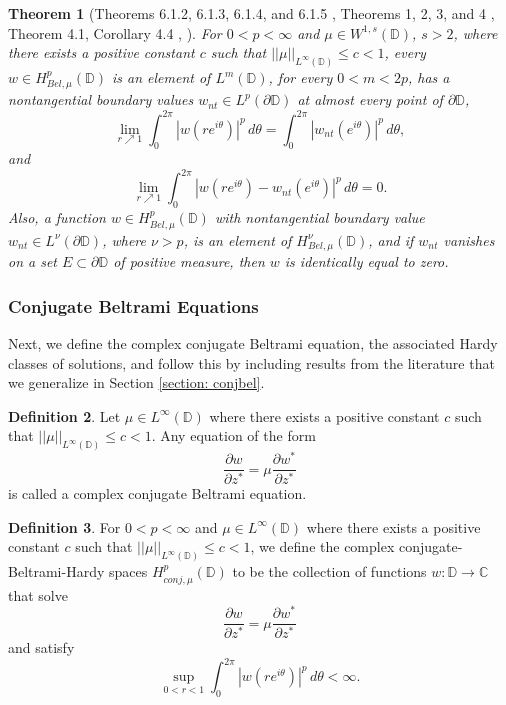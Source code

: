 \documentclass[12pt,reqno]{amsart}
\newtheorem{theorem}{Theorem}[section]
\theoremstyle{definition}
\newtheorem{deff}[theorem]{Definition}
\theoremstyle{remark}
\newcommand{\p}{\partial}
\newcommand{\disk}{\mathbb{D}}
\begin{document}
 \begin{theorem}[Theorems 6.1.2, 6.1.3, 6.1.4, and 6.1.5 \cite{KlimBook}, Theorems 1, 2, 3, and 4 \cite{Klim2016}, Theorem 4.1, Corollary 4.4  \cite{quasiHardy}, \cite{Zins}]\label{thm: belhpinbetterlp}\label{thm: belbvcon}\label{thm: betterbvbetterleb}\label{thm: zeroposmesidentzero}
             For $0 < p < \infty$ and $\mu \in W^{1,s}(\disk)$, $s>2$, where there exists a positive constant $c$ such that $||\mu||_{L^\infty(\disk)} \leq c < 1$, every $w \in H^{p}_{Bel,\mu}(\disk)$ is an element of $L^m(\disk)$, for every $0 < m < 2p$, has a nontangential boundary values $w_{nt} \in L^p(\partial \disk)$ at almost every point of $\p \disk$,
        \[
            \lim_{r\nearrow 1} \int_0^{2\pi} |w(re^{i\theta})|^p \, d\theta = \int_0^{2\pi} |w_{nt}(e^{i\theta})|^p \,d\theta,
        \]
and
        \[
            \lim_{r\nearrow 1} \int_0^{2\pi} |w(re^{i\theta})- w_{nt}(e^{i\theta})|^p \, d\theta = 0.
        \]
Also, a function $w \in H^p_{Bel,\mu}(\disk)$ with nontangential boundary value $w_{nt} \in L^\nu(\p \disk)$, where $\nu > p$, is an element of $H^\nu_{Bel,\mu}(\disk)$, and if $w_{nt}$ vanishes on a set $E \subset \p \disk$ of positive measure, then $w$ is identically equal to zero.
        \end{theorem}



        \subsubsection{Conjugate Beltrami Equations}

        

        Next, we define the complex conjugate Beltrami equation, the associated Hardy classes of solutions, and follow this by including results from the literature that we generalize in Section \ref{section: conjbel}.

        \begin{deff}
            Let $\mu \in L^\infty(\disk)$ where there exists a positive constant $c$ such that $||\mu||_{L^\infty(\disk)} \leq c < 1$. Any equation of the form 
            \[
                \frac{\p w}{\p z^*} = \mu \frac{\p w^*}{\p  z^*}
            \]
            is called a complex conjugate Beltrami equation. 
        \end{deff}

        \begin{deff}
            For $0 < p < \infty$ and $\mu \in L^\infty(\disk)$ where there exists a positive constant $c$ such that $||\mu||_{L^\infty(\disk)} \leq c < 1$, we define the complex conjugate-Beltrami-Hardy spaces $H^p_{conj,\mu}(\disk)$ to be the collection of functions $w:\disk\to\mathbb{C}$ that solve
            \[
                \frac{\p w}{\p z^*} = \mu \frac{\p w^*}{\p  z^*}
            \]
            and satisfy  
            \[
            \sup_{0 < r < 1} \int_0^{2\pi} |w(re^{i\theta})|^p\,d\theta  < \infty.
            \]
        \end{deff}
\end{document}
